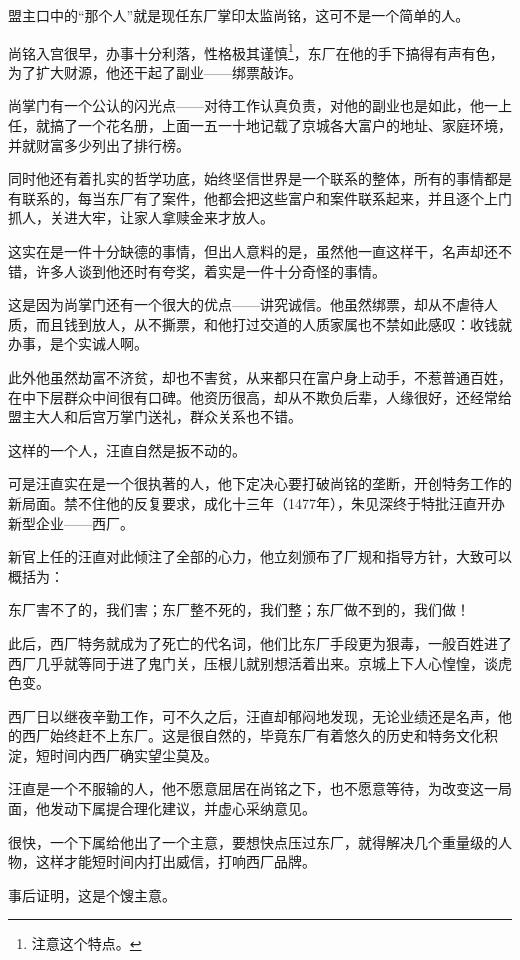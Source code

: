 \begin{multicols}{\theparacolNo}
盟主口中的“那个人”就是现任东厂掌印太监尚铭，这可不是一个简单的人。

尚铭入宫很早，办事十分利落，性格极其谨慎\footnote{注意这个特点。}，东厂在他的手下搞得有声有色，为了扩大财源，他还干起了副业——绑票敲诈。

尚掌门有一个公认的闪光点——对待工作认真负责，对他的副业也是如此，他一上任，就搞了一个花名册，上面一五一十地记载了京城各大富户的地址、家庭环境，并就财富多少列出了排行榜。

同时他还有着扎实的哲学功底，始终坚信世界是一个联系的整体，所有的事情都是有联系的，每当东厂有了案件，他都会把这些富户和案件联系起来，并且逐个上门抓人，关进大牢，让家人拿赎金来才放人。

这实在是一件十分缺德的事情，但出人意料的是，虽然他一直这样干，名声却还不错，许多人谈到他还时有夸奖，着实是一件十分奇怪的事情。

这是因为尚掌门还有一个很大的优点——讲究诚信。他虽然绑票，却从不虐待人质，而且钱到放人，从不撕票，和他打过交道的人质家属也不禁如此感叹：收钱就办事，是个实诚人啊。

此外他虽然劫富不济贫，却也不害贫，从来都只在富户身上动手，不惹普通百姓，在中下层群众中间很有口碑。他资历很高，却从不欺负后辈，人缘很好，还经常给盟主大人和后宫万掌门送礼，群众关系也不错。

这样的一个人，汪直自然是扳不动的。

可是汪直实在是一个很执著的人，他下定决心要打破尚铭的垄断，开创特务工作的新局面。禁不住他的反复要求，成化十三年（1477年），朱见深终于特批汪直开办新型企业——西厂。

新官上任的汪直对此倾注了全部的心力，他立刻颁布了厂规和指导方针，大致可以概括为：

东厂害不了的，我们害；东厂整不死的，我们整；东厂做不到的，我们做！

此后，西厂特务就成为了死亡的代名词，他们比东厂手段更为狠毒，一般百姓进了西厂几乎就等同于进了鬼门关，压根儿就别想活着出来。京城上下人心惶惶，谈虎色变。

西厂日以继夜辛勤工作，可不久之后，汪直却郁闷地发现，无论业绩还是名声，他的西厂始终赶不上东厂。这是很自然的，毕竟东厂有着悠久的历史和特务文化积淀，短时间内西厂确实望尘莫及。

汪直是一个不服输的人，他不愿意屈居在尚铭之下，也不愿意等待，为改变这一局面，他发动下属提合理化建议，并虚心采纳意见。

很快，一个下属给他出了一个主意，要想快点压过东厂，就得解决几个重量级的人物，这样才能短时间内打出威信，打响西厂品牌。

事后证明，这是个馊主意。


\end{multicols}
